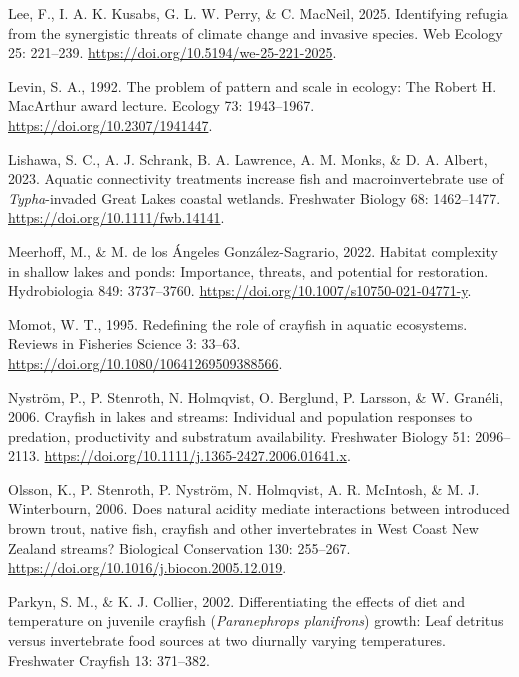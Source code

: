 \documentclass[
  letterpaper,
  DIV=11,
  numbers=noendperiod]{scrartcl}
\newlength{\cslhangindent}
\newenvironment{CSLReferences}[2] %
 {\begin{list}{}{%
  \setlength{\itemindent}{0pt}
  \setlength{\leftmargin}{0pt}
  \setlength{\parsep}{0pt}
  \ifodd #1
   \setlength{\leftmargin}{\cslhangindent}
   \setlength{\itemindent}{-1\cslhangindent}
  \fi
  \setlength{\itemsep}{#2\baselineskip}}}
 {\end{list}}
\begin{document}
\begin{CSLReferences}{0}{1}
Lee, F., I. A. K. Kusabs, G. L. W. Perry, \& C. MacNeil, 2025.
Identifying refugia from the synergistic threats of climate change and
invasive species. Web Ecology 25: 221--239.
\url{https://doi.org/10.5194/we-25-221-2025}.

Levin, S. A., 1992. The problem of pattern and scale in ecology: The
{Robert H. MacArthur} award lecture. Ecology 73: 1943--1967.
\url{https://doi.org/10.2307/1941447}.

Lishawa, S. C., A. J. Schrank, B. A. Lawrence, A. M. Monks, \& D. A.
Albert, 2023. Aquatic connectivity treatments increase fish and
macroinvertebrate use of {\emph{Typha}}-invaded {Great Lakes} coastal
wetlands. Freshwater Biology 68: 1462--1477.
\url{https://doi.org/10.1111/fwb.14141}.

Meerhoff, M., \& M. de los Ángeles González-Sagrario, 2022. Habitat
complexity in shallow lakes and ponds: Importance, threats, and
potential for restoration. Hydrobiologia 849: 3737--3760.
\url{https://doi.org/10.1007/s10750-021-04771-y}.

Momot, W. T., 1995. Redefining the role of crayfish in aquatic
ecosystems. Reviews in Fisheries Science 3: 33--63.
\url{https://doi.org/10.1080/10641269509388566}.

Nyström, P., P. Stenroth, N. Holmqvist, O. Berglund, P. Larsson, \& W.
Granéli, 2006. Crayfish in lakes and streams: Individual and population
responses to predation, productivity and substratum availability.
Freshwater Biology 51: 2096--2113.
\url{https://doi.org/10.1111/j.1365-2427.2006.01641.x}.

Olsson, K., P. Stenroth, P. Nyström, N. Holmqvist, A. R. McIntosh, \& M.
J. Winterbourn, 2006. Does natural acidity mediate interactions between
introduced brown trout, native fish, crayfish and other invertebrates in
{West Coast New Zealand} streams? Biological Conservation 130: 255--267.
\url{https://doi.org/10.1016/j.biocon.2005.12.019}.

Parkyn, S. M., \& K. J. Collier, 2002. Differentiating the effects of
diet and temperature on juvenile crayfish ({\emph{Paranephrops
planifrons}}) growth: Leaf detritus versus invertebrate food sources at
two diurnally varying temperatures. Freshwater Crayfish 13: 371--382.


\end{CSLReferences}
\end{document}
